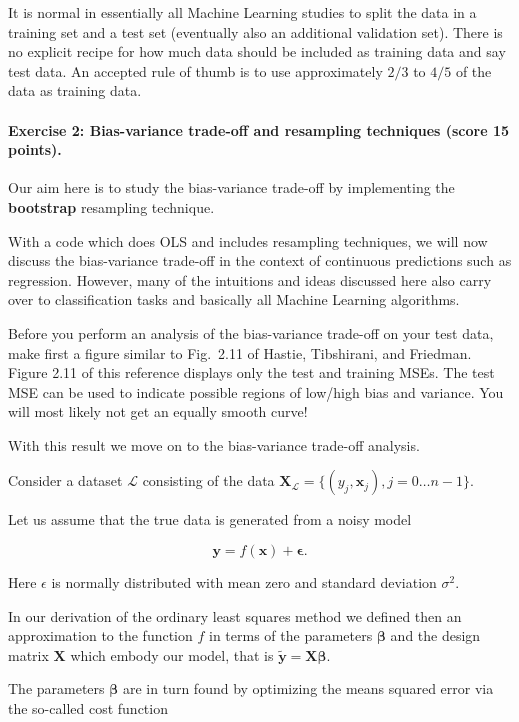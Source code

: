 \documentclass[%
oneside,                 %
final,                   %
10pt]{article}
\begin{document}
It is normal in essentially all Machine Learning studies to split the
data in a training set and a test set (eventually  also an additional
validation set).  There
is no explicit recipe for how much data should be included as training
data and say test data.  An accepted rule of thumb is to use
approximately $2/3$ to $4/5$ of the data as training data.






\paragraph{Exercise 2: Bias-variance trade-off and resampling techniques (score 15 points).}
Our aim here is to study the bias-variance trade-off by implementing the \textbf{bootstrap} resampling technique.

With a code which does OLS and includes resampling techniques, 
we will now discuss the bias-variance trade-off in the context of
continuous predictions such as regression. However, many of the
intuitions and ideas discussed here also carry over to classification
tasks and basically all Machine Learning algorithms. 

Before you perform an analysis of the bias-variance trade-off on your test data, make
first a figure similar to Fig.~2.11 of Hastie, Tibshirani, and
Friedman. Figure 2.11 of this reference displays only the test and training MSEs. The test MSE can be used to 
indicate possible regions of low/high bias and variance. You will most likely not get an
equally smooth curve!

With this result we move on to the bias-variance trade-off analysis.

Consider a
dataset $\mathcal{L}$ consisting of the data
$\mathbf{X}_\mathcal{L}=\{(y_j, \boldsymbol{x}_j), j=0\ldots n-1\}$.

Let us assume that the true data is generated from a noisy model

\[
\bm{y}=f(\boldsymbol{x}) + \bm{\epsilon}.
\]

Here $\epsilon$ is normally distributed with mean zero and standard
deviation $\sigma^2$.

In our derivation of the ordinary least squares method we defined then
an approximation to the function $f$ in terms of the parameters
$\bm{\beta}$ and the design matrix $\bm{X}$ which embody our model,
that is $\bm{\tilde{y}}=\bm{X}\bm{\beta}$.

The parameters $\bm{\beta}$ are in turn found by optimizing the means
squared error via the so-called cost function
\end{document}
